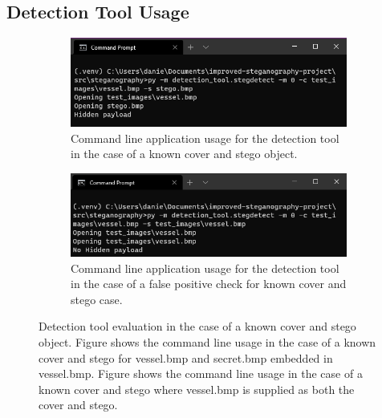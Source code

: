 \documentclass{l4proj}
\begin{document}
\begin{appendices}
\section{Detection Tool Usage}
 \begin{figure}[!h]
    \centering
    \begin{subfigure}[b]{0.75\textwidth}
        \includegraphics[width=\textwidth]{images/evaluation_detection_tool_knowncover.png}
        \caption{Command line application usage for the detection tool in the case of a known cover and stego object.}
        \label{fig:known_cover_and_stego}
    \end{subfigure}
    \begin{subfigure}[b]{0.75\textwidth}
        \includegraphics[width=\textwidth]{images/knowncover_false_check.png}
        \caption{Command line application usage for the detection tool in the case of a false positive check for known cover and stego case.}
        \label{fig:known_cover_and_stego_falsecheck}
    \end{subfigure}
    \caption{Detection tool evaluation in the case of a known cover and stego object. Figure  shows the command line usage in the case of a known cover and stego for vessel.bmp and secret.bmp embedded in vessel.bmp. Figure  shows the command line usage in the case of a known cover and stego where vessel.bmp is supplied as both the cover and stego.}
\end{figure}


\end{appendices}
\end{document}
